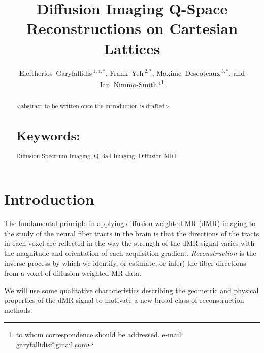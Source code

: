 \documentclass{bioinfo}
\begin{document}

\title[EIT]{Diffusion Imaging Q-Space Reconstructions on Cartesian Lattices}

\author[Garyfallidis, Yeh and
Nimmo-Smith]{Eleftherios~Garyfallidis\,$^{1,4,*}$, Frank~Yeh\,$^{2,*}$, Maxime~Descoteaux\,$^{3,*}$, and
  Ian~Nimmo-Smith\,$^{4}$\footnote{to whom correspondence should be
    addressed. e-mail: garyfallidis@gmail.com}}

\address{\,$^{1}$Wolfson College, University of Cambridge, Cambridge, UK\\
  \,$^{2}$Carnegie~Mellon, Pittsburgh.\\
  \,$^{3}$University of Sherbrooke, Canada.\\
  \,$^{4}$MRC Cognition and Brain Sciences Unit, Cambridge, UK.\\}

\history{}

\editor{}

\maketitle

\begin{abstract}
\noindent

<abstract to be written once the introduction is drafted>

\section{Keywords:} Diffusion Spectrum Imaging, Q-Ball Imaging,
Diffusion MRI.

\end{abstract}

\section{Introduction}

The fundamental principle in applying diffusion weighted MR (dMR)
imaging to the study of the neural fiber tracts in the brain is that the
directions of the tracts in each voxel are reflected in the way the
strength of the dMR signal varies with the magnitude and orientation of
each acquisition gradient.  \emph{Reconstruction} is the inverse process
by which we identify, or estimate, or infer) the fiber directions from a
voxel of diffusion weighted MR data. 

We will use some qualitative characteristics describing the geometric
and physical properties of the dMR signal to motivate a new broad class
of reconstruction methods.
\end{document}
